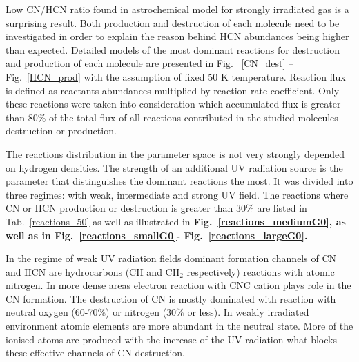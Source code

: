 \documentclass{aa}
\begin{document}

Low CN/HCN ratio found in astrochemical model for strongly irradiated gas is a surprising result.
Both production and destruction of each molecule need to be investigated in order to explain the
reason behind HCN abundances being higher than expected. Detailed models of the most dominant
reactions for destruction and production of each molecule are presented in Fig. ~\ref{CN_dest} –
Fig.~\ref{HCN_prod} with the assumption of fixed 50 K temperature. Reaction flux is defined as
reactants abundances multiplied by reaction rate coefficient. Only these reactions were taken into
consideration which accumulated flux is greater than 80$\%$ of the total flux of all reactions
contributed in the studied molecules destruction or production.

The reactions distribution in the parameter space is not very strongly depended on hydrogen
densities. The strength of an additional UV radiation source is the parameter that distinguishes the
dominant reactions the most. It was divided into three regimes: with weak, intermediate and strong
UV field. The reactions where CN or HCN production or destruction is greater than 30$\%$ are listed
in Tab.~\ref{reactions_50} as well as illustrated in \textbf{Fig.~\ref{reactions_mediumG0}, as well as in Fig.~\ref{reactions_smallG0}-
Fig.~\ref{reactions_largeG0}.}

In the regime of weak UV radiation fields dominant formation channels of CN and HCN are hydrocarbons
(CH and CH$_2$ respectively) reactions with atomic nitrogen. In more dense areas electron reaction
with CNC cation plays role in the CN formation. The destruction of CN is mostly dominated with
reaction with neutral oxygen (60-70$\%$) or nitrogen (30$\%$ or less). In weakly irradiated
environment atomic elements are more abundant in the neutral state. More of the ionised atoms are
produced with the increase of the UV radiation what blocks these effective channels of CN
destruction.
\end{document}

